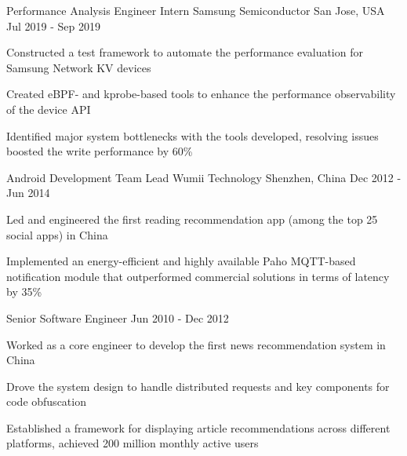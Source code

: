 \begin{cventries}
  \cventry
    {Performance Analysis Engineer Intern} %
    {Samsung Semiconductor} %
    {San Jose, USA} %
    {Jul 2019 - Sep 2019} %
    {
      \begin{cvitems} %
        \item {Constructed a test framework to automate the performance evaluation for Samsung Network KV devices}
        \item {Created eBPF- and kprobe-based tools to enhance the performance observability of the device API}
        \item {Identified major system bottlenecks with the tools developed, resolving issues boosted the write performance by 60\%}
      \end{cvitems}
    }

  \cventry
    {Android Development Team Lead} %
    {Wumii Technology} %
    {Shenzhen, China} %
    {Dec 2012 - Jun 2014} %
    {
      \begin{cvitems} %
        \item {Led and engineered the first reading recommendation app (among the top 25 social apps) in China}
        \item {Implemented an energy-efficient and highly available Paho MQTT-based notification module that outperformed commercial solutions in terms of latency by 35\%}
      \end{cvitems}
    }

  \cventry
    {Senior Software Engineer}
    {} %
    {} %
    {Jun 2010 - Dec 2012} %
    {
      \begin{cvitems} %
        \item {Worked as a core engineer to develop the first news recommendation system in China}
        \item {Drove the system design to handle distributed requests and key components for code obfuscation}
        \item{Established a framework for displaying article recommendations across different platforms, achieved 200 million monthly active users}
      \end{cvitems}
    }

\end{cventries}
